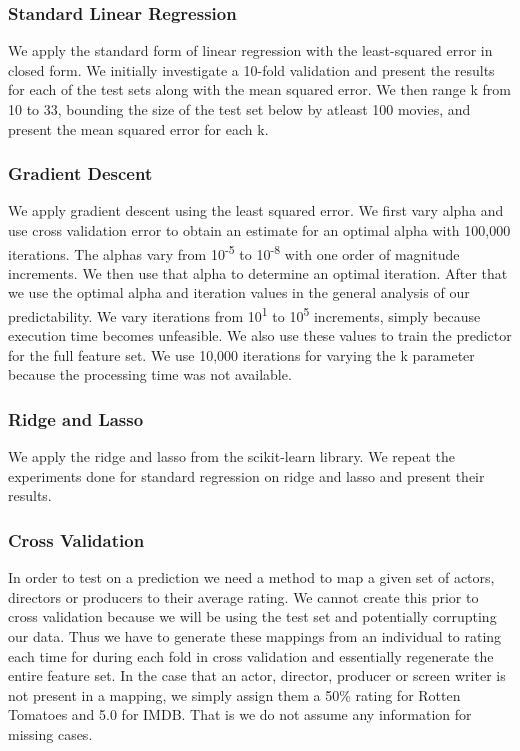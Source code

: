 \documentclass[conference]{IEEEtran}
\begin{document}
\subsubsection{Standard Linear Regression}
We apply the standard form of linear regression with the least-squared error 
in closed form. We initially investigate a 10-fold validation and present the results
for each of the test sets along with the mean squared error. We then 
range k from 10 to 33, bounding the size of the test set below by atleast 100 movies, 
and present the mean squared error for each k. 

\subsubsection{Gradient Descent}
We apply gradient descent using the least squared error. We first vary alpha and 
use cross validation error to obtain an estimate for an optimal alpha with 100,000 iterations.
The alphas vary from 10\textsuperscript{-5} to 10\textsuperscript{-8} with one order of magnitude increments. 
We then use that alpha to determine an optimal iteration. After that we use the optimal alpha
and iteration values in the general analysis of our predictability. We vary iterations from
10\textsuperscript{1} to 10\textsuperscript{5} increments, simply because execution time becomes unfeasible.
We also use these values to train the predictor for the full feature set. We use 10,000 iterations 
for varying the k parameter because the processing time was not available. 

\subsubsection{Ridge and Lasso}
We apply the ridge and lasso from the scikit-learn library. We repeat the experiments
done for standard regression on ridge and lasso and present their results.

\subsubsection{Cross Validation}
In order to test on a prediction we need a method to map a given set of actors, directors or producers to
their average rating. We cannot create this prior to cross validation because we will be using the test set 
and potentially corrupting our data. Thus we have to generate these mappings from an individual to rating 
each time for during each fold in cross validation and essentially regenerate the entire feature set. 
In the case that an actor, director, producer or screen writer is not present in a mapping, we simply assign 
them a 50\% rating for Rotten Tomatoes and 5.0 for IMDB. That is we do not assume any information for missing cases.
\end{document}
